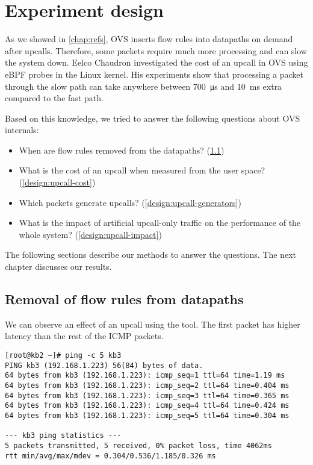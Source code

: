 \chapter{Experiment design}
\label{chap:design}

As we showed in \cref{chap:refs}, OVS inserts flow rules into datapaths on demand after upcalls. Therefore, some packets require much more processing and can slow the system down. Eelco Chaudron investigated the cost of an upcall in OVS using eBPF probes in the Linux kernel. His experiments show that processing a packet through the slow path can take anywhere between \qty{700}{\us} and \qty{10}{\ms} extra compared to the fast path.

Based on this knowledge, we tried to answer the following questions about OVS internals:

\begin{itemize}
    \item When are flow rules removed from the datapaths? (\cref{design:flow-eviction})
    \item What is the cost of an upcall when measured from the user space? (\cref{design:upcall-cost})
    \item Which packets generate upcalls? (\cref{design:upcall-generators})
    \item What is the impact of artificial upcall-only traffic on the performance of the whole system? (\cref{design:upcall-impact})
\end{itemize}

The following sections describe our methods to answer the questions. The next chapter discusses our results.




\section{Removal of flow rules from datapaths}
\label{design:flow-eviction}

We can observe an effect of an upcall using the  tool. The first packet has higher latency than the rest of the ICMP packets.

\vspace{0.5cm}

\begin{lstlisting}[caption=Output of the \ident{ping} command in the virtualized environment, captionpos=b, basicstyle=\ttfamily\scriptsize]
[root@kb2 ~]# ping -c 5 kb3
PING kb3 (192.168.1.223) 56(84) bytes of data.
64 bytes from kb3 (192.168.1.223): icmp_seq=1 ttl=64 time=1.19 ms
64 bytes from kb3 (192.168.1.223): icmp_seq=2 ttl=64 time=0.404 ms
64 bytes from kb3 (192.168.1.223): icmp_seq=3 ttl=64 time=0.365 ms
64 bytes from kb3 (192.168.1.223): icmp_seq=4 ttl=64 time=0.424 ms
64 bytes from kb3 (192.168.1.223): icmp_seq=5 ttl=64 time=0.304 ms

--- kb3 ping statistics ---
5 packets transmitted, 5 received, 0% packet loss, time 4062ms
rtt min/avg/max/mdev = 0.304/0.536/1.185/0.326 ms
\end{lstlisting}

